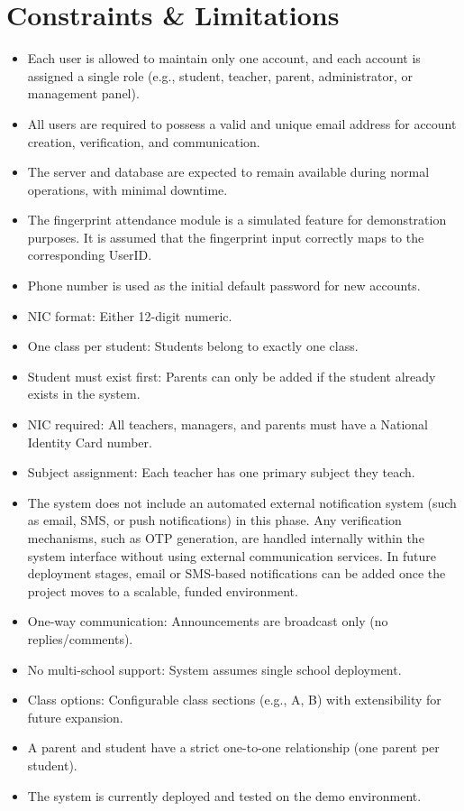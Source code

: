 \documentclass[12pt, a4paper]{report}
\begin{document}
\section{Constraints \& Limitations}

\begin{itemize}
    \item Each user is allowed to maintain only one account, and each account is assigned a single role (e.g., student, teacher, parent, administrator, or management panel).
    \item All users are required to possess a valid and unique email address for account creation, verification, and communication.
    \item The server and database are expected to remain available during normal operations, with minimal downtime.
    \item The fingerprint attendance module is a simulated feature for demonstration purposes. It is assumed that the fingerprint input correctly maps to the corresponding UserID.
    \item Phone number is used as the initial default password for new accounts.
    \item NIC format: Either 12-digit numeric.
    \item One class per student: Students belong to exactly one class.
    \item Student must exist first: Parents can only be added if the student already exists in the system.
    \item NIC required: All teachers, managers, and parents must have a National Identity Card number.
    \item Subject assignment: Each teacher has one primary subject they teach.
    \item The system does not include an automated external notification system (such as email, SMS, or push notifications) in this phase. Any verification mechanisms, such as OTP generation, are handled internally within the system interface without using external communication services. In future deployment stages, email or SMS-based notifications can be added once the project moves to a scalable, funded environment.
    \item One-way communication: Announcements are broadcast only (no replies/comments).
    \item No multi-school support: System assumes single school deployment.
    \item Class options: Configurable class sections (e.g., A, B) with extensibility for future expansion.
    \item A parent and student have a strict one-to-one relationship (one parent per student).
    \item The system is currently deployed and tested on the demo environment.
\end{itemize}
\end{document}
